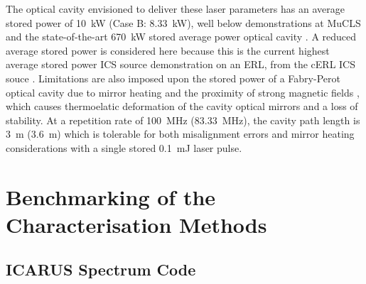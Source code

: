 \documentclass[../main.tex]{subfiles}
\begin{document}
The optical cavity envisioned to deliver these laser parameters has an average stored power of 10~\si{\kilo\watt} (Case B: 8.33~\si{\kilo\watt}), well below demonstrations at MuCLS \cite{eggl2016munich} and the state-of-the-art 670~\si{\kilo\watt} stored average power optical cavity \cite{carstens2014megawatt}. A reduced average stored power is considered here because this is the current highest average stored power ICS source demonstration on an ERL, from the cERL ICS souce \cite{akagi2016narrow}. Limitations are also imposed upon the stored power of a Fabry-Perot optical cavity due to mirror heating \cite{chaikovska2016high} and the proximity of strong magnetic fields \cite{gunther2019device}, which causes thermoelatic deformation of the cavity optical mirrors and a loss of stability. At a repetition rate of 100~\si{\mega\hertz} (83.33~\si{\mega\hertz}), the cavity path length is 3~\si{\meter} (3.6~\si{\meter})  which is tolerable for both misalignment errors \cite{zomer2009polarization} and mirror heating considerations with a single stored 0.1~\si{\milli\joule} laser pulse.  

\section{Benchmarking of the Characterisation Methods}
\label{sec:benchmarking_of_the_characterisation_methods}

\subsection{ICARUS Spectrum Code}
\label{sec:ICARUS_benchmarking}
\end{document}
